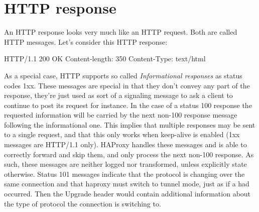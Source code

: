 \pagebreak[4]
\section{HTTP response}

An HTTP response looks very much like an HTTP request. Both are called HTTP
messages. Let's consider this HTTP response:

\label{HTTP response}\begin{listing}{1}
HTTP/1.1 200 OK
Content-length: 350
Content-Type: text/html
\end{listing}

As a special case, HTTP supports so called \emph{Informational responses} as status
codes 1xx. These messages are special in that they don't convey any part of the
response, they're just used as sort of a signaling message to ask a client to
continue to post its request for instance. In the case of a status 100 response
the requested information will be carried by the next non-100 response message
following the informational one. This implies that multiple responses may be
sent to a single request, and that this only works when keep-alive is enabled
(1xx messages are HTTP/1.1 only). HAProxy handles these messages and is able to
correctly forward and skip them, and only process the next non-100 response. As
such, these messages are neither logged nor transformed, unless explicitly
state otherwise. Status 101 messages indicate that the protocol is changing
over the same connection and that haproxy must switch to tunnel mode, just as
if a  had occurred. Then the Upgrade header would contain additional
information about the type of protocol the connection is switching to.


